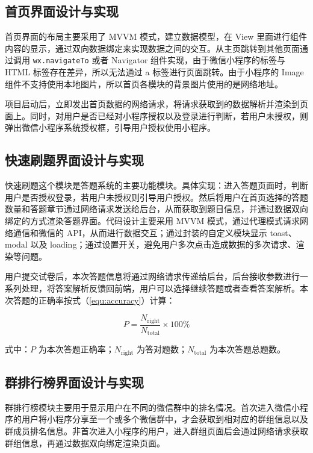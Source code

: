 \subsection{首页界面设计与实现}

首页界面的布局主要采用了 MVVM 模式，建立数据模型，在 View 里面进行组件内容的显示，通过双向数据绑定来实现数据之间的交互。从主页跳转到其他页面通过调用 \texttt{wx.navigateTo} 或者 Navigator 组件实现，由于微信小程序的标签与 HTML 标签存在差异，所以无法通过 a 标签进行页面跳转。由于小程序的 Image 组件不支持使用本地图片，所以首页各模块的背景图片使用的是网络地址。

项目启动后，立即发出首页数据的网络请求，将请求获取到的数据解析并渲染到页面上。同时，对用户是否已经对小程序授权以及登录进行判断，若用户未授权，则弹出微信小程序系统授权框，引导用户授权使用小程序。

\subsection{快速刷题界面设计与实现}

快速刷题这个模块是答题系统的主要功能模块。具体实现：进入答题页面时，判断用户是否授权登录，若用户未授权则引导用户授权。然后将用户在首页选择的答题数量和答题章节通过网络请求发送给后台，从而获取到题目信息，并通过数据双向绑定的方式渲染答题界面。代码设计主要采用 MVVM 模式，通过代理模式请求网络通信和微信的 API，从而进行数据交互；通过封装的自定义模块显示 toast、modal 以及 loading；通过设置开关，避免用户多次点击造成数据的多次请求、渲染等问题。

用户提交试卷后，本次答题信息将通过网络请求传递给后台，后台接收参数进行一系列处理，将答案解析反馈回前端，用户可以选择继续答题或者查看答案解析。本次答题的正确率按式（\ref{equ:accuracy}）计算：

\begin{equation}
  P = \frac{N_{\mathrm{right}}}{N_{\mathrm{total}}} \times 100\%
  \label{equ:accuracy}
\end{equation}

式中：$P$ 为本次答题正确率；$N_{\mathrm{right}}$ 为答对题数；$N_{\mathrm{total}}$ 为本次答题总题数。

\subsection{群排行榜界面设计与实现}

群排行榜模块主要用于显示用户在不同的微信群中的排名情况。首次进入微信小程序的用户将小程序分享至一个或多个微信群中，才会获取到相对应的群组信息以及群成员排名信息。非首次进入小程序的用户，进入群组页面后会通过网络请求获取群组信息，再通过数据双向绑定渲染页面。

